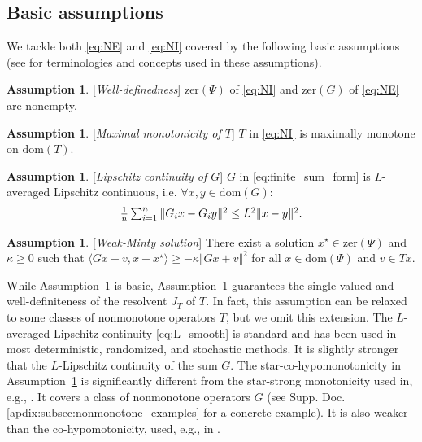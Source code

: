 \documentclass{article}
\newcommand{\norms}[1]{\Vert#1\Vert}
\newcommand{\iprods}[1]{\langle #1\rangle}
\newcommand{\dom}[1]{\mathrm{dom}(#1)}
\newcommand{\zer}[1]{\mathrm{zer}(#1)}
\newcommand{\beforesubsec}{\vspace{-1.5ex}}
\newcommand{\aftersubsec}{\vspace{-1.5ex}}
\theoremstyle{plain}
\theoremstyle{definition}
\newtheorem{assumption}[theorem]{Assumption}
\theoremstyle{remark}
\begin{document}
\beforesubsec
\subsection{Basic assumptions}\label{subsec:basic_assumptions}
\aftersubsec
We tackle both \eqref{eq:NE} and \eqref{eq:NI} covered by the following basic assumptions (see \cite{Bauschke2011} for terminologies and concepts used in these assumptions).

\begin{assumption}\label{as:A0}[\textit{Well-definedness}]
$\zer{\Psi}$ of \eqref{eq:NI} and $\zer{G}$ of \eqref{eq:NE} are nonempty.
\end{assumption}

\begin{assumption}\label{as:A0b}[\textit{Maximal monotonicity of $T$}]
$T$ in \eqref{eq:NI} is maximally monotone on $\dom{T}$.
\end{assumption}

\begin{assumption}\label{as:A1}[\textit{Lipschitz continuity of $G$}]
$G$ in \eqref{eq:finite_sum_form} is $L$-averaged Lipschitz continuous, i.e. $\forall x, y \in \dom{G}$:
\vspace{-0.75ex}
\begin{equation}\label{eq:L_smooth}
\begin{array}{l}
\frac{1}{n} \sum_{i=1}^n \norms{G_ix - G_iy}^2 \leq L^2\norms{x - y}^2.
\end{array}
\vspace{-0.5ex}
\end{equation}
\end{assumption}

\begin{assumption}\label{as:A2}[\textit{Weak-Minty solution}]
There exist a solution $x^{\star} \in \zer{\Psi}$ and  $\kappa \geq 0$ such that $\iprods{Gx + v, x - x^{\star}} \geq - \kappa \norms{Gx + v}^2$ for all $x \in \dom{\Psi}$ and $v \in Tx$.
\end{assumption}

While Assumption~\ref{as:A0} is basic, Assumption~\ref{as:A0b} guarantees the single-valued and well-definiteness of the resolvent $J_{T}$ of $T$. 
In fact, this assumption can be relaxed to some classes of nonmonotone operators $T$, but we omit this extension.
The $L$-averaged Lipschitz continuity \eqref{eq:L_smooth} is standard and has been used in most deterministic, randomized, and stochastic methods.
It is slightly stronger that the $L$-Lipschitz continuity of the sum $G$.
The star-co-hypomonotonicity in Assumption~\ref{as:A2} is significantly different from  the star-strong monotonicity used in, e.g., \cite{kotsalis2022simple}.
It covers a class of nonmonotone operators $G$ (see Supp. Doc. \ref{apdix:subsec:nonmonotone_examples} for a concrete example).
It is also weaker than the co-hypomotonicity, used, e.g., in \cite{cai2023variance}.
\end{document}
